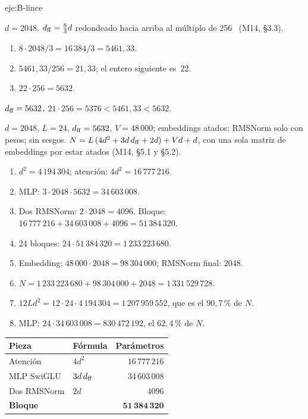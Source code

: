 \begin{solucion}{eje:B-lince}

\datos $d=2048$.
\planteamiento $d_{\mathrm{ff}}=\tfrac{8}{3}d$ redondeado hacia arriba al múltiplo de 256~\cite{shazeer} (M14, §3.3).
\pasos
\begin{enumerate}[label=\arabic*.]
  \item $8\cdot 2048/3=16\,384/3=5461{,}33$.
  \item $5461{,}33/256=21{,}33$; el entero siguiente es~22.
  \item $22\cdot 256=5632$.
\end{enumerate}
\resultado \textbf{$d_{\mathrm{ff}}=5632$.}
\comprobacion $21\cdot 256=5376<5461{,}33<5632$.

\datos $d=2048$, $L=24$, $d_{\mathrm{ff}}=5632$, $V=48\,000$; embeddings atados; RMSNorm solo con pesos; sin sesgos.
\planteamiento $N=L\,(4d^{2}+3d\,d_{\mathrm{ff}}+2d)+Vd+d$, con una sola matriz de embeddings por estar atados (M14, §5.1 y §5.2).
\pasos
\begin{enumerate}[label=\arabic*.]
  \item $d^{2}=4\,194\,304$; atención: $4d^{2}=16\,777\,216$.
  \item MLP: $3\cdot 2048\cdot 5632=34\,603\,008$.
  \item Dos RMSNorm: $2\cdot 2048=4096$. Bloque: $16\,777\,216+34\,603\,008+4096=51\,384\,320$.
  \item 24 bloques: $24\cdot 51\,384\,320=1\,233\,223\,680$.
  \item Embedding: $48\,000\cdot 2048=98\,304\,000$; RMSNorm final: $2048$.
  \item $N=1\,233\,223\,680+98\,304\,000+2048=1\,331\,529\,728$.
  \item $12Ld^{2}=12\cdot 24\cdot 4\,194\,304=1\,207\,959\,552$, que es el $90{,}7\,\%$ de $N$.
  \item MLP: $24\cdot 34\,603\,008=830\,472\,192$, el $62{,}4\,\%$ de $N$.
\end{enumerate}

\begin{center}\small
\begin{tabular}{@{}llr@{}}
\toprule
Pieza & Fórmula & Parámetros \\
\midrule
Atención & $4d^{2}$ & $16\,777\,216$ \\
MLP SwiGLU & $3d\,d_{\mathrm{ff}}$ & $34\,603\,008$ \\
Dos RMSNorm & $2d$ & $4096$ \\
\midrule
\textbf{Bloque} & & $\mathbf{51\,384\,320}$ \\
\bottomrule
\end{tabular}
\end{center}


\end{solucion}
